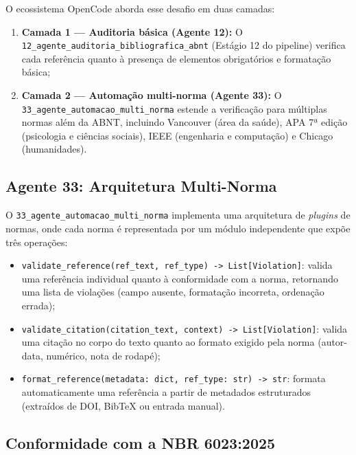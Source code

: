 O ecossistema OpenCode aborda esse desafio em duas camadas:

\begin{enumerate}
    \item \textbf{Camada 1 — Auditoria básica (Agente 12):} O
    \texttt{12\_agente\_auditoria\_bibliografica\_abnt} (Estágio 12
    do pipeline) verifica cada referência quanto à presença de
    elementos obrigatórios e formatação básica;

    \item \textbf{Camada 2 — Automação multi-norma (Agente 33):} O
    \texttt{33\_agente\_automacao\_multi\_norma} estende a
    verificação para múltiplas normas além da ABNT, incluindo
    Vancouver (área da saúde), APA 7ª edição (psicologia e
    ciências sociais), IEEE (engenharia e computação) e Chicago
    (humanidades).
\end{enumerate}

\subsection{Agente 33: Arquitetura Multi-Norma}
\label{sec:agente33_arquitetura}

O \texttt{33\_agente\_automacao\_multi\_norma} implementa uma
arquitetura de \textit{plugins} de normas, onde cada norma é
representada por um módulo independente que expõe três operações:

\begin{itemize}
    \item \texttt{validate\_reference(ref\_text, ref\_type) ->
    List[Violation]}: valida uma referência individual quanto à
    conformidade com a norma, retornando uma lista de violações
    (campo ausente, formatação incorreta, ordenação errada);

    \item \texttt{validate\_citation(citation\_text, context) ->
    List[Violation]}: valida uma citação no corpo do texto quanto
    ao formato exigido pela norma (autor-data, numérico, nota de
    rodapé);

    \item \texttt{format\_reference(metadata: dict, ref\_type: str)
    -> str}: formata automaticamente uma referência a partir de
    metadados estruturados (extraídos de DOI, BibTeX ou entrada
    manual).
\end{itemize}

\subsection{Conformidade com a NBR 6023:2025}
\label{sec:nbr6023}

